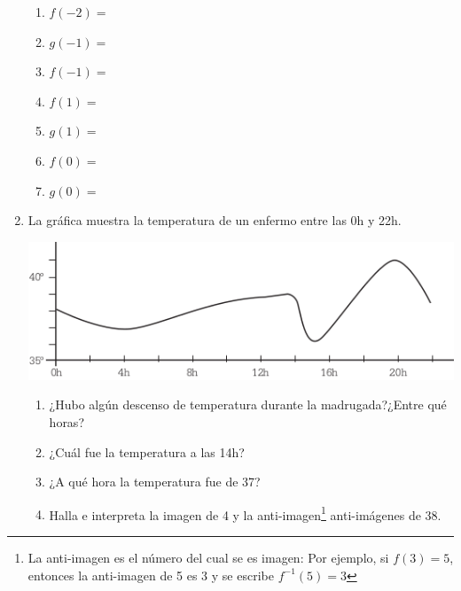 \documentclass[fleqn]{article}
\begin{document}
\begin{enumerate}
\begin{minipage}{.45\textwidth}
\end{minipage}
\begin{minipage}{.5\textwidth}
\begin{enumerate}
\item $f(-2)=$\noanswer
\item $g(-1)=$\noanswer
\item $f(-1)=$\noanswer
\item $f(1)=$\noanswer
\item $g(1)=$\noanswer
\item $f(0)=$\noanswer
\item $g(0)=$\noanswer
\end{enumerate}
\end{minipage}
\item La gráfica muestra la temperatura de un enfermo entre las
0h y 22h.
\begin{center}
\includegraphics[scale=.5]{Images/PantallazoFunc.png} 
\end{center}
\begin{enumerate}
\item ¿Hubo algún descenso de temperatura durante la madrugada?¿Entre qué horas?\noanswer
\item ¿Cuál fue la temperatura a las 14h?\noanswer
\item ¿A qué hora la temperatura fue de 37\textcelsius? \noanswer
\item Halla e interpreta la imagen de 4 y la anti-imagen\footnote{La anti-imagen es el número del cual se es imagen: Por ejemplo, si $f(3)=5$, entonces la anti-imagen de 5 es 3 y se escribe $f^{-1}(5)=3$} anti-imágenes de 38\textcelsius.\noanswer

\end{enumerate}
\end{enumerate}
\end{document}
